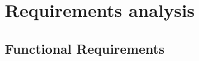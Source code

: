 \documentclass[11pt,a4paper]{article}
\begin{document}











\section{Requirements analysis}

\subsection{Functional Requirements}
\end{document}
